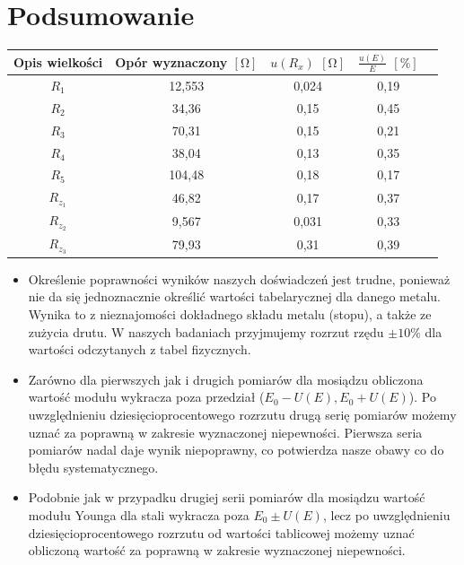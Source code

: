 \documentclass [a4paper,11pt]{article}
\begin{document}
	\section{Podsumowanie}
	\begin{center}
		\begin{tabular}{|c|c|c|c|c|}
			\hline Opis wielkości & Opór wyznaczony $[\mathrm{\Omega}]$ & $u(R_x)$ $[\mathrm{\Omega}]$ &  $ \frac{u(E)}{E} $ $[\%]$ \\
			\hline $R_1$ & 12,553 & 0,024 & 0,19  \\
			\hline $R_2$ & 34,36 & 0,15 & 0,45  \\
			\hline $R_3$ & 70,31 & 0,15 & 0,21  \\
			\hline $R_4$ & 38,04 & 0,13 & 0,35  \\
			\hline $R_5$ & 104,48 & 0,18 & 0,17  \\
			\hline $R_{z_1}$ & 46,82 & 0,17 & 0,37  \\
			\hline $R_{z_2}$ & 9,567 & 0,031 & 0,33  \\  
			\hline $R_{z_3}$ & 79,93 & 0,31 & 0,39  \\ 
			\hline 
		\end{tabular} 
	\end{center}
\vspace{1em}

\begin{itemize}
	\item Określenie poprawności wyników naszych doświadczeń jest trudne, ponieważ nie da się jednoznacznie określić wartości tabelarycznej dla danego metalu. Wynika to z nieznajomości dokładnego składu metalu (stopu), a także ze zużycia drutu. W naszych badaniach przyjmujemy rozrzut rzędu $\pm10\%$ dla wartości odczytanych z tabel fizycznych.
	
	\item Zarówno dla pierwszych jak i drugich pomiarów dla mosiądzu obliczona wartość modułu wykracza poza przedział ($E_0-U(E), E_0+U(E)$). Po uwzględnieniu dziesięcioprocentowego rozrzutu drugą serię pomiarów możemy uznać za poprawną w zakresie wyznaczonej niepewności. Pierwsza seria pomiarów nadal daje wynik niepoprawny, co potwierdza nasze obawy co do błędu systematycznego.
	
	\item Podobnie jak w przypadku drugiej serii pomiarów dla mosiądzu wartość modułu Younga dla stali wykracza poza $E_0 \pm U(E)$, lecz po uwzględnieniu dziesięcioprocentowego rozrzutu od wartości tablicowej możemy uznać obliczoną wartość za poprawną w zakresie wyznaczonej niepewności.
\end{itemize}
\end{document}
